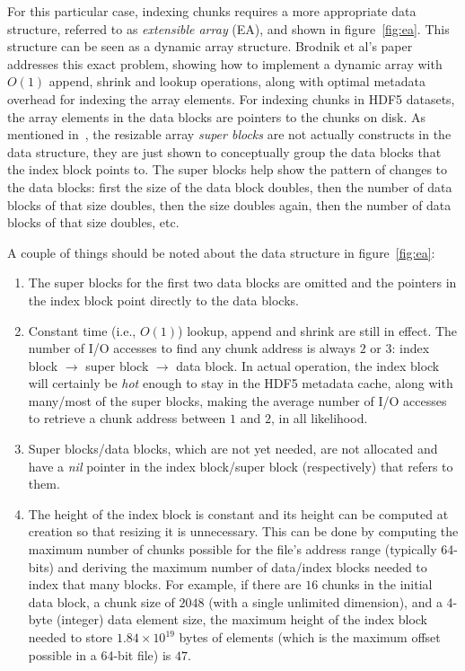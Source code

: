 \begin{figure*}
\centering

\caption{Simplified version of extensible array structure used for indexing chunks.}
\label{fig:ea}
\end{figure*}

For this particular case, indexing chunks requires a more appropriate data
structure, referred to as \textit{extensible array} (EA), and shown in
figure~\ref{fig:ea}. This structure can be seen as a dynamic array structure.
Brodnik et al's paper~\cite{Brodnik1999} addresses this exact problem,
showing how to implement a dynamic array with $O(1)$ append, shrink and lookup
operations, along with optimal metadata overhead for indexing the array elements.
For indexing chunks in HDF5 datasets, the array elements in the data blocks are
pointers to the chunks on disk.
As mentioned in~\cite{Brodnik1999}, the resizable array \textit{super blocks} are not actually 
constructs in the data structure, they are just shown to conceptually group the data 
blocks that the index block points to. The super blocks help show the pattern of 
changes to the data blocks: first the size of the data block doubles, then the 
number of data blocks of that size doubles, then the size doubles again, then the 
number of data blocks of that size doubles, etc.

A couple of things should be noted about the data structure in figure~\ref{fig:ea}:
\begin{enumerate}
\item The super blocks for the first two data blocks are omitted and the pointers
in the index block point directly to the data blocks.
\item Constant time (i.e., $O(1)$) lookup, append and shrink are still in effect.
The number of I/O accesses to find any chunk address is always $2$ or $3$:
index block $\rightarrow$ super block $\rightarrow$ data block. In
actual operation, the index block will certainly be \textit{hot} enough to stay
in the HDF5 metadata cache, along with many/most of the super blocks,
making the average number of I/O accesses to retrieve a chunk address between
$1$ and $2$, in all likelihood.
\item Super blocks/data blocks, which are not yet needed, are not allocated and
have a \textit{nil} pointer in the index block/super block (respectively) that
refers to them.
\item The height of the index block is constant and its height can be computed
at creation so that resizing it is unnecessary. This can be done by computing
the maximum number of chunks possible for the file's address range
(typically 64-bits) and deriving the maximum number of data/index blocks needed
to index that many blocks. For example, if there are $16$ chunks in the initial
data block, a chunk size of $2048$ (with a single unlimited dimension), and a
4-byte (integer) data element size, the maximum height of the index block needed to
store $1.84\times 10^{19}$ bytes of elements (which is the maximum offset
possible in a 64-bit file) is $47$.
\end{enumerate}

